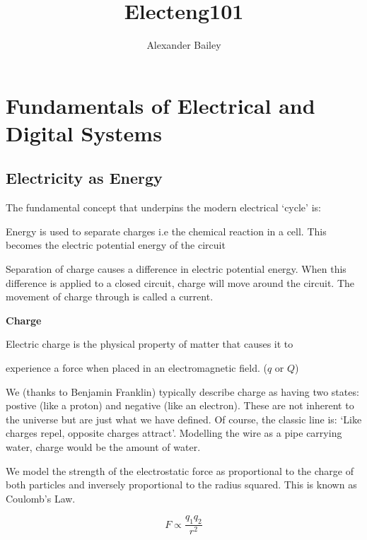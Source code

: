 \documentclass[12pt]{article}
\begin{document}
\setlength{\parskip}{\baselineskip}%

\title{Electeng101}
\author{Alexander Bailey}
\maketitle
\flushbottom

\section{Fundamentals of Electrical and Digital Systems}
\subsection{Electricity as Energy}
The fundamental concept that underpins the modern electrical `cycle' is: 
\begin{definition*}
  Energy is used to separate charges i.e the chemical reaction in a cell. This becomes the electric potential energy of the circuit
\end{definition*}

Separation of charge causes a difference in electric potential energy.
When this difference is applied to a closed circuit, charge will move around the circuit.
The movement of charge through is called a current. 

\textbf{Charge}
\begin{definition*}
  Electric charge is the physical property of matter that causes it to 

  experience a force when placed in an electromagnetic field. ($q$ or $Q$)
\end{definition*}

We (thanks to Benjamin Franklin) typically describe charge as having two states: postive (like a proton) and negative (like an electron).
These are not inherent to the universe but are just what we have defined.
Of course, the classic line is: `Like charges repel, opposite charges attract'.
Modelling the wire as a pipe carrying water, charge would be the amount of water. 

We model the strength of the electrostatic force as proportional to the charge of both particles and inversely proportional to the radius squared.
This is known as Coulomb's Law.

\begin{equation*}
  F \propto \frac{q_1q_2}{r^2}
\end{equation*}
\end{document}

